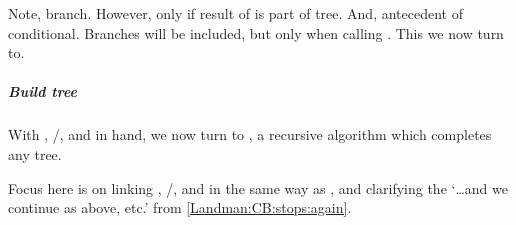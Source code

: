 \begin{note}
  Note, branch.
  However, only if result of \AlgGetPStops{} is part of tree.
  And, antecedent of conditional.
  Branches will be included, but only when calling \AlgFindBranches{}.
  This we now turn to.
\end{note}


\subparagraph{Build tree}
\label{cha:sec:fcs-def:progressive-landman:alg:tree}

\begin{note}
  With \AlgAC{}, \AlgGetStops{}/\AlgGetPStops{}, and \AlgFindBranches{} in hand, we now turn to \AlgDevelopTree{}, a recursive algorithm which completes any tree.

  Focus here is on linking \AlgAC{}, \AlgGetStops{}/\AlgGetPStops{}, and \AlgFindBranches{} in the same way as \citeauthor{Landman:1992wh}, and clarifying the `\dots and we continue as above, etc.' from \ref{Landman:CB:stops:again}.


\end{note}
